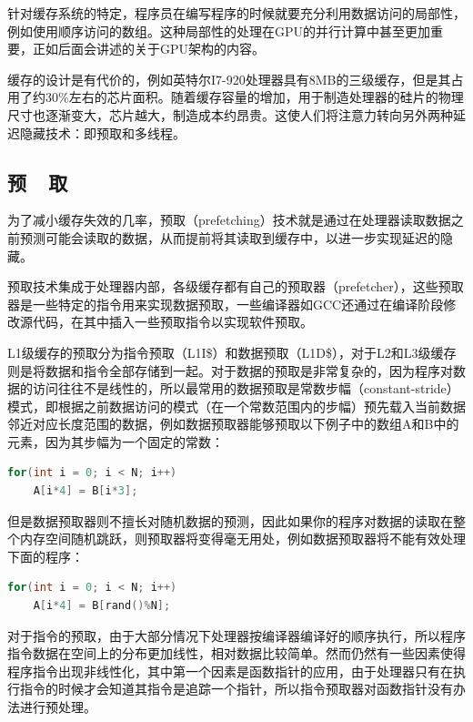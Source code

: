 针对缓存系统的特定，程序员在编写程序的时候就要充分利用数据访问的局部性，例如使用顺序访问的数组。这种局部性的处理在GPU的并行计算中甚至更加重要，正如后面会讲述的关于GPU架构的内容。



缓存的设计是有代价的，例如英特尔I7-920处理器具有8MB的三级缓存，但是其占用了约$30\%$左右的芯片面积。随着缓存容量的增加，用于制造处理器的硅片的物理尺寸也逐渐变大，芯片越大，制造成本约昂贵。这使人们将注意力转向另外两种延迟隐藏技术：即预取和多线程。




\subsection{预~~取}
为了减小缓存失效的几率，预取（prefetching）技术就是通过在处理器读取数据之前预测可能会读取的数据，从而提前将其读取到缓存中，以进一步实现延迟的隐藏。

预取技术集成于处理器内部，各级缓存都有自己的预取器（prefetcher），这些预取器是一些特定的指令用来实现数据预取，一些编译器如GCC还通过在编译阶段修改源代码，在其中插入一些预取指令以实现软件预取。

L1级缓存的预取分为指令预取（L1I\$）和数据预取（L1D\$），对于L2和L3级缓存则是将数据和指令全部存储到一起。对于数据的预取是非常复杂的，因为程序对数据的访问往往不是线性的，所以最常用的数据预取是常数步幅（constant-stride）模式，即根据之前数据访问的模式（在一个常数范围内的步幅）预先载入当前数据邻近对应长度范围的数据，例如数据预取器能够预取以下例子中的数组A和B中的元素，因为其步幅为一个固定的常数：

\begin{lstlisting}[language=C++,mathescape]
for(int i = 0; i < N; i++)
    A[i*4] = B[i*3];
\end{lstlisting}

但是数据预取器则不擅长对随机数据的预测，因此如果你的程序对数据的读取在整个内存空间随机跳跃，则预取器将变得毫无用处，例如数据预取器将不能有效处理下面的程序：

\begin{lstlisting}[language=C++,mathescape]
for(int i = 0; i < N; i++)
    A[i*4] = B[rand()%N];
\end{lstlisting}

对于指令的预取，由于大部分情况下处理器按编译器编译好的顺序执行，所以程序指令数据在空间上的分布更加线性，相对数据比较简单。然而仍然有一些因素使得程序指令出现非线性化，其中第一个因素是函数指针的应用，由于处理器只有在执行指令的时候才会知道其指令是追踪一个指针，所以指令预取器对函数指针没有办法进行预处理。

